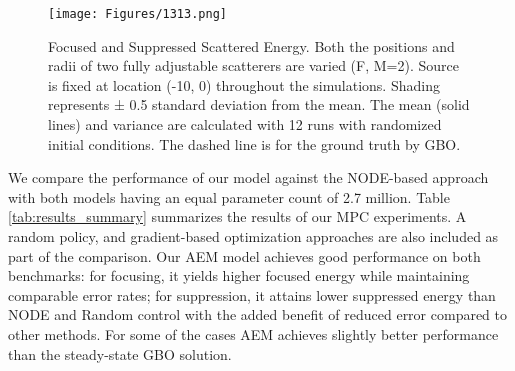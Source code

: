 \begin{figure}%
\texttt{[image: Figures/1313.png]}
\caption{Focused and Suppressed Scattered Energy.  Both the positions and radii of two fully adjustable scatterers are varied (F, M=2). Source is fixed at location (-10, 0) throughout the simulations. Shading represents ± 0.5 standard deviation from the mean. The mean (solid lines) and variance are calculated with 12 runs with randomized initial conditions. The dashed line is for the ground truth by GBO.}\label{fullyAdj_mean}
\end{figure}


We compare the performance of our model against the NODE-based approach with both models having an equal parameter count of 2.7 million. Table \ref{tab:results_summary} summarizes the results of our MPC experiments. A random policy, and gradient-based optimization approaches are also included as part of the comparison. Our AEM model achieves good performance on both benchmarks: for focusing, it yields higher focused energy while maintaining comparable error rates; for suppression, it attains lower suppressed energy than NODE and Random control with the added benefit of reduced error compared to other methods. For some of the cases AEM achieves slightly better performance than the steady-state GBO solution.








